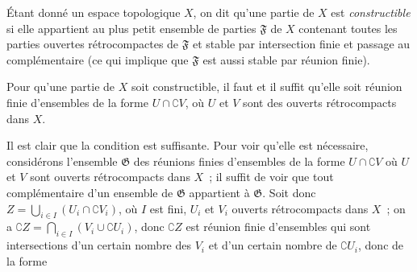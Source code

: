 \begin{definition}[9.1.2]
\label{0.9.1.2-fr}
Étant donné un espace topologique $X$, on dit qu'une partie de $X$ est
\emph{constructible} si elle appartient au plus petit ensemble de parties
$\mathfrak{F}$ de $X$ contenant toutes les parties ouvertes rétrocompactes de
$\mathfrak{F}$ et stable par intersection finie et passage au complémentaire
(ce qui implique que $\mathfrak{F}$ est aussi stable par réunion finie).
\end{definition}

\begin{proposition}[9.1.3]
\label{0.9.1.3-fr}
Pour qu'une partie de $X$ soit constructible, il faut et il suffit qu'elle
soit réunion finie d'ensembles de la forme $U\cap\complement{V}$, où $U$ et
$V$ sont des ouverts rétrocompacts dans $X$.
\end{proposition}

Il est clair que la condition est suffisante. Pour voir qu'elle est
nécessaire, considérons l'ensemble $\mathfrak{G}$ des réunions finies
d'ensembles de la forme $U\cap\complement{V}$ où $U$ et $V$ sont ouverts
rétrocompacts dans $X$~; il suffit de voir que tout complémentaire d'un
ensemble de $\mathfrak{G}$ appartient à $\mathfrak{G}$. Soit donc
$Z=\bigcup_{i\in I}(U_i\cap\complement{V_i})$, où $I$ est fini, $U_i$ et
$V_i$ ouverts rétrocompacts dans $X$~; on a
$\complement{Z}=\bigcap_{i\in I}(V_i\cup\complement{U_i})$, donc
$\complement{Z}$ est réunion finie d'ensembles qui sont intersections d'un
certain nombre des $V_i$ et d'un certain nombre de $\complement{U_i}$, donc
de la forme
